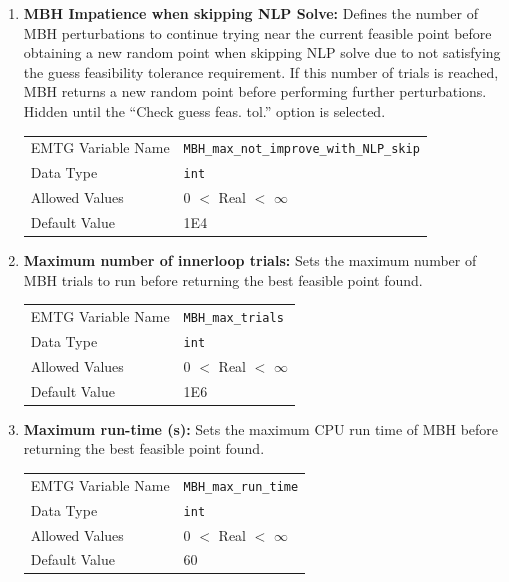 \begin{enumerate}
    \item \textbf{\ac{MBH} Impatience when skipping \ac{NLP} Solve:} Defines the number of \ac{MBH} perturbations to continue trying near the current feasible point before obtaining a new random point when skipping \ac{NLP} solve due to not satisfying the guess feasibility tolerance requirement. If this number of trials is reached, \ac{MBH} returns a new random point before performing further perturbations. Hidden until the ``Check guess feas. tol.'' option is selected.
    \begin{table}[H]
        \hspace{2cm}
        \begin{tabular}{lp{5cm}}
        \ac{EMTG} Variable Name & \verb|MBH_max_not_improve_with_NLP_skip| \\
        Data Type & \verb|int| \\
        Allowed Values & $0$ $<$ Real $<$ $\infty$ \\
        Default Value & 1E4 \\
        \end{tabular}
    \end{table}
    
    
    \item \textbf{Maximum number of innerloop trials:} Sets the maximum number of \ac{MBH} trials to run before returning the best feasible point found.
    \begin{table}[H]
        \hspace{2cm}
        \begin{tabular}{lp{5cm}}
        \ac{EMTG} Variable Name & \verb|MBH_max_trials| \\
        Data Type & \verb|int| \\
        Allowed Values & $0$ $<$ Real $<$ $\infty$ \\
        Default Value & 1E6 \\
        \end{tabular}
    \end{table}
    
    \item \textbf{Maximum run-time (s):} Sets the maximum CPU run time of \ac{MBH} before returning the best feasible point found.
    \begin{table}[H]
        \hspace{2cm}
        \begin{tabular}{lp{5cm}}
        \ac{EMTG} Variable Name & \verb|MBH_max_run_time| \\
        Data Type & \verb|int| \\
        Allowed Values & $0$ $<$ Real $<$ $\infty$ \\
        Default Value & $60$ \\
        \end{tabular}
    \end{table}
    

\end{enumerate}
